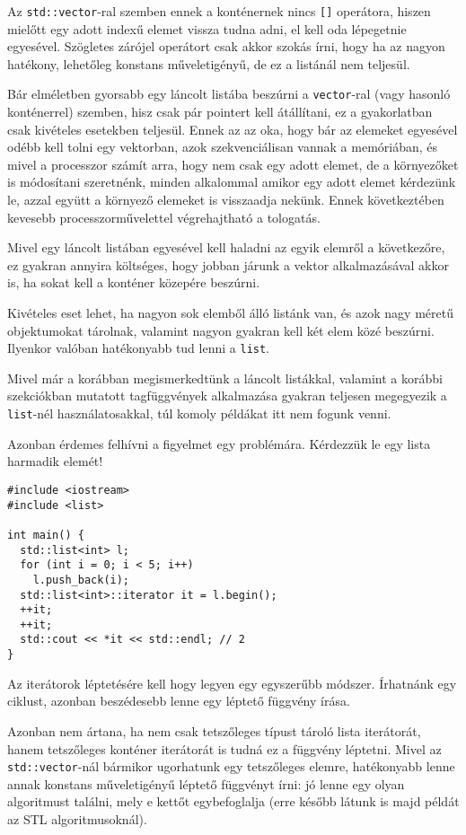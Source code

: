 \documentclass[../cpp_book/cpp_book.tex]{subfiles}
\begin{document}
	Az \texttt{std::vector}-ral szemben ennek a konténernek nincs \texttt{[]} operátora, hiszen mielőtt egy adott indexű elemet vissza tudna adni, el kell oda lépegetnie egyesével. Szögletes zárójel operátort csak akkor szokás írni, hogy ha az nagyon hatékony, lehetőleg konstans műveletigényű, de ez a listánál nem teljesül.
	\begin{note}
		Bár elméletben gyorsabb egy láncolt listába beszúrni a \texttt{vector}-ral (vagy hasonló konténerrel) szemben, hisz csak pár pointert kell átállítani, ez a gyakorlatban csak kivételes esetekben teljesül. Ennek az az oka, hogy bár az elemeket egyesével odébb kell tolni egy vektorban, azok szekvenciálisan vannak a memóriában, és mivel a processzor számít arra, hogy nem csak egy adott elemet, de a környezőket is módosítani szeretnénk, minden alkalommal amikor egy adott elemet kérdezünk le, azzal együtt a környező elemeket is visszaadja nekünk. Ennek következtében kevesebb processzorművelettel végrehajtható a tologatás.
		
		Mivel egy láncolt listában egyesével kell haladni az egyik elemről a következőre, ez gyakran annyira költséges, hogy jobban járunk a vektor alkalmazásával akkor is, ha sokat kell a konténer közepére beszúrni.
		
		Kivételes eset lehet, ha nagyon sok elemből álló listánk van, és azok nagy méretű objektumokat tárolnak, valamint nagyon gyakran kell két elem közé beszúrni. Ilyenkor valóban hatékonyabb tud lenni a \texttt{list}.
	\end{note}
	Mivel már a korábban megismerkedtünk a láncolt listákkal, valamint a korábbi szekciókban mutatott tagfüggvények alkalmazása gyakran teljesen megegyezik a \texttt{list}-nél használatosakkal, túl komoly példákat itt nem fogunk venni. 
	
	Azonban érdemes felhívni a figyelmet egy problémára. Kérdezzük le egy lista harmadik elemét!
	\begin{lstlisting}
#include <iostream>
#include <list>

int main() {
  std::list<int> l;
  for (int i = 0; i < 5; i++)
    l.push_back(i);
  std::list<int>::iterator it = l.begin();
  ++it;
  ++it;
  std::cout << *it << std::endl; // 2
}
	\end{lstlisting}	
	Az iterátorok léptetésére kell hogy legyen egy egyszerűbb módszer. Írhatnánk egy ciklust, azonban beszédesebb lenne egy léptető függvény írása.
	
	Azonban nem ártana, ha nem csak tetszőleges típust tároló lista iterátorát, hanem tetszőleges konténer iterátorát is tudná ez a függvény léptetni. Mivel az \texttt{std::vector}-nál bármikor ugorhatunk egy tetszőleges elemre, hatékonyabb lenne annak konstans műveletigényű léptető függvényt írni: jó lenne egy olyan algoritmust találni, mely e kettőt egybefoglalja (erre később látunk is majd példát az STL algoritmusoknál).
	
\end{document}
